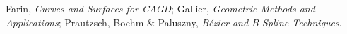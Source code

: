 \begin{remark*}
Farin, \textit{Curves and Surfaces for CAGD};
Gallier, \textit{Geometric Methods and Applications};
Prautzsch, Boehm \& Paluszny, \textit{B\'ezier and B-Spline
Techniques}.
\end{remark*}



\clearpage

% 
% 
% 
% 
% 
% 
% 
% 
